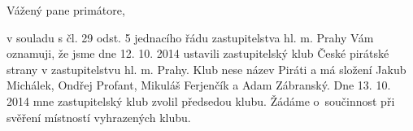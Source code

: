 \documentclass[11pt,a4paper,czech]{article}
\begin{document}

\def \yoursign { }
\def \yourdate { }
\def \oursign {ZK Pha 1/2014}
\def \place {Praha}

\printheader

\subject{Ustavení zastupitelského klubu České pirátské strany}

Vážený pane primátore,

v souladu s čl. 29 odst. 5 jednacího řádu zastupitelstva hl. m. Prahy Vám oznamuji, že jsme dne 12. 10. 2014 ustavili zastupitelský klub České pirátské strany v zastupitelstvu hl. m. Prahy. Klub nese název Piráti a má složení Jakub Michálek, Ondřej Profant, Mikuláš Ferjenčík a Adam Zábranský. Dne 13. 10. 2014 mne zastupitelský klub zvolil předsedou klubu. Žádáme o~součinnost při svěření místností vyhrazených klubu.

\signature{Mgr. Bc. Jakub Michálek \\ předseda klubu Pirátů \\ zastupitelstvo hl. m. Prahy}

\end{document}
